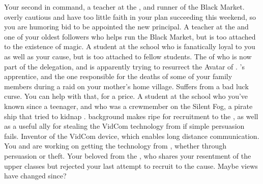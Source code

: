 \documentclass[char]{GL2020}
\begin{document}
\begin{contacts}
    \contact{\cChupSecond{}} Your second in command, a teacher at the \pSc{}, and runner of the Black Market. \cChupSecond{\Theyare} overly cautious and have too little faith in your plan succeeding this weekend, so you are humoring \cChupSecond{\their} bid to be appointed the new principal.
    \contact{\cChupInventor{}} A teacher at the \pSc{} and one of your oldest followers who helps run the Black Market, but is too attached to the existence of magic.     
    \contact{\cChupStudent{}} A student at the school who is fanatically loyal to you as well as your cause, but is too attached to \cChupStudent{\their} fellow students. 
    \contact{\cEbbPriest{}} The \cEbbPriest{\cleric} of \cEbb{} who is now part of the \pShip{} delegation, and is apparently trying to resurrect the Avatar of \cEbb{}.
    \contact{\cJuniorStatesman{}} \cHeadDiplomat{}'s apprentice, and the one responsible for the deaths of some of your \cCurse{\formal} family members during a \pShippie{} raid on your mother's home village.
    \contact{\cInitiate{}} Suffers from a bad luck curse. You can help with that, for a price.
    \contact{\cPirateChild{}} A student at the school  who you've known since \cPirateChild{\theywere} a teenager, and who was a crewmember on the Silent Fog, a pirate ship that tried to kidnap \cHeadDiplomat{}. \cPirateChild{\Their} background makes \cPirateChild{\them} ripe for recruitment to the \pGoaties{}, as well as a useful ally for stealing the VidCom technology from \cTechStar{} if simple persuasion fails.
    \contact{\cTechStar{}} Inventor of the VidCom device, which enables long distance communication. You and \cChupInventor{} are working on getting the technology from \cTechStar{\them}, whether through persuasion or theft.
    \contact{\cCurse{}} Your beloved \cCurse{\auncle} from the \pFarm{}, who shares your resentment of the upper classes but rejected your last attempt to recruit \cCurse{\them} to the cause. Maybe \cCurse{\their} views have changed since?
\end{contacts}
\end{document}
